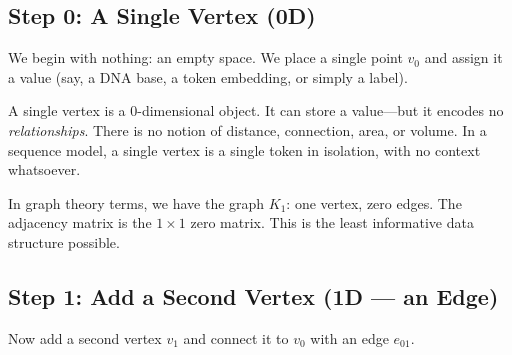 \subsection{Step 0: A Single Vertex (0D)}
\label{sec:step0-vertex}

We begin with nothing: an empty space. We place a single point $v_0$ and assign
it a value (say, a DNA base, a token embedding, or simply a label).

\begin{center}
\end{center}

A single vertex is a 0-dimensional object. It can store a value---but it encodes
no \emph{relationships}. There is no notion of distance, connection, area, or volume.
In a sequence model, a single vertex is a single token in isolation, with no
context whatsoever.

\begin{remark}
In graph theory terms, we have the graph $K_1$: one vertex, zero edges. The
adjacency matrix is the $1 \times 1$ zero matrix. This is the least informative
data structure possible.
\end{remark}

\subsection{Step 1: Add a Second Vertex (1D --- an Edge)}
\label{sec:step1-edge}

Now add a second vertex $v_1$ and connect it to $v_0$ with an edge $e_{01}$.

\begin{center}
\end{center}

